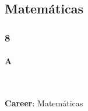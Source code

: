 \documentclass{article}
\newcommand{\subsubsubsection}[1]{ \paragraph{#1}\mbox{}\\ }
\begin{document}
                        
                        \newpage
                        \subsection{Matem\'aticas}
\subsubsection{8}
\subsubsubsection{A}

                        \begin{flushright}
                        {\LARGE \textbf{Career}: Matem\'aticas}
                        \end{flushright}
                         \vspace{1cm}
                
\end{document}

